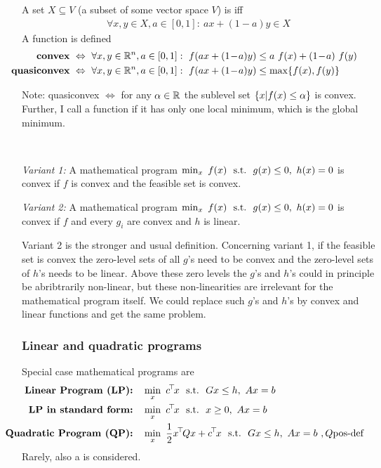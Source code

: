 \begin{myDefinition}
A set $X\subseteq V$ (a subset of some vector space $V$) is  iff
\begin{align}
\forall x,y\in X, a\in[0,1]:~ ax + (1\!-\!a)y \in X
\end{align}
A function is defined
{\small \begin{align}
\hspace*{-10mm}\Def{convex} &\iff \forall x,y\in\RRR^n, a\in[0,1]:~ f(ax + (1\!-\!a)y) \le a~ f(x) + (1\!-\!a)~ f(y) \\
\hspace*{-10mm}\Def{quasiconvex} &\iff \forall x,y\in\RRR^n, a\in[0,1]:~ f(ax + (1\!-\!a)y) \le \max\{f(x), f(y)\}
\end{align}}
\end{myDefinition}
Note: quasiconvex $\iff$ for any $\alpha\in{\mathbb{R}}$ the sublevel set $\{ x |
f(x)\le \alpha\}$ is convex. Further, I call a function 
if it has only one local minimum, which is the global minimum.

\begin{myDefinition} ~

\emph{Variant 1:} A mathematical program $\min_x~ f(x) ~~\text{s.t.}~~ g(x)\le 0,~ h(x) =
0$ is convex if $f$ is convex and the feasible set is convex.

\emph{Variant 2:} A mathematical program $\min_x~ f(x) ~~\text{s.t.}~~ g(x)\le 0,~ h(x) =
0$ is convex if $f$ and every $g_i$ are convex and $h$ is linear.
\end{myDefinition}
Variant 2 is the stronger and usual definition. Concerning variant 1,
if the feasible set is convex the zero-level sets of all $g$'s need to
be convex and the zero-level sets of $h$'s needs to be linear. Above
these zero levels the $g$'s and $h$'s could in principle be
abribtrarily non-linear, but these non-linearities are irrelevant for
the mathematical program itself. We could replace such $g$'s and $h$'s
by convex and linear functions and get the same problem.

\subsubsection{Linear and quadratic programs}
\begin{myDefinition}
Special case mathematical programs are
\begin{align*}
\hspace*{-10mm}\Def{Linear Program (LP):}\quad & \min_x~ c^\T x \st G x \le h,~ Ax=b \\
\hspace*{-10mm}\Def{LP in standard form:}\quad & \min_x~ c^\T x \st x \ge 0,~ Ax=b \\
\hspace*{-10mm}\Def{Quadratic Program (QP):}\quad & \min_x~ \half x^\T Q x + c^\T x   \st   G x \le h,~ Ax=b~, Q \text{pos-def}
\end{align*}
Rarely, also a  is considered.
\end{myDefinition}

